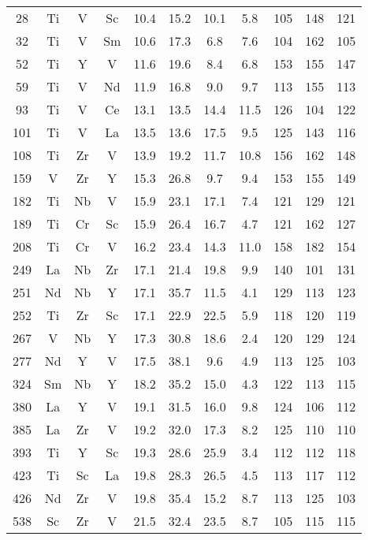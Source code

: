 \begin{center}
\begin{xtabular}{c|ccc|cccc|ccc}
 28 &  Ti &  V &  Sc & 10.4 & 15.2 & 10.1 & 5.8 & 105 & 148 & 121 \\
 32 &  Ti &  V &  Sm & 10.6 & 17.3 & 6.8 & 7.6 & 104 & 162 & 105 \\
 52 &  Ti &  Y &  V & 11.6 & 19.6 & 8.4 & 6.8 & 153 & 155 & 147 \\
 59 &  Ti &  V &  Nd & 11.9 & 16.8 & 9.0 & 9.7 & 113 & 155 & 113 \\
 93 &  Ti &  V &  Ce & 13.1 & 13.5 & 14.4 & 11.5 & 126 & 104 & 122 \\
 101 &  Ti &  V &  La & 13.5 & 13.6 & 17.5 & 9.5 & 125 & 143 & 116 \\
 108 &  Ti &  Zr &  V & 13.9 & 19.2 & 11.7 & 10.8 & 156 & 162 & 148 \\
 159 &  V &  Zr &  Y & 15.3 & 26.8 & 9.7 & 9.4 & 153 & 155 & 149 \\
 182 &  Ti &  Nb &  V & 15.9 & 23.1 & 17.1 & 7.4 & 121 & 129 & 121 \\
 189 &  Ti &  Cr &  Sc & 15.9 & 26.4 & 16.7 & 4.7 & 121 & 162 & 127 \\
 208 &  Ti &  Cr &  V & 16.2 & 23.4 & 14.3 & 11.0 & 158 & 182 & 154 \\
 249 &  La &  Nb &  Zr & 17.1 & 21.4 & 19.8 & 9.9 & 140 & 101 & 131 \\
 251 &  Nd &  Nb &  Y & 17.1 & 35.7 & 11.5 & 4.1 & 129 & 113 & 123 \\
 252 &  Ti &  Zr &  Sc & 17.1 & 22.9 & 22.5 & 5.9 & 118 & 120 & 119 \\
 267 &  V &  Nb &  Y & 17.3 & 30.8 & 18.6 & 2.4 & 120 & 129 & 124 \\
 277 &  Nd &  Y &  V & 17.5 & 38.1 & 9.6 & 4.9 & 113 & 125 & 103 \\
 324 &  Sm &  Nb &  Y & 18.2 & 35.2 & 15.0 & 4.3 & 122 & 113 & 115 \\
 380 &  La &  Y &  V & 19.1 & 31.5 & 16.0 & 9.8 & 124 & 106 & 112 \\
 385 &  La &  Zr &  V & 19.2 & 32.0 & 17.3 & 8.2 & 125 & 110 & 110 \\
 393 &  Ti &  Y &  Sc & 19.3 & 28.6 & 25.9 & 3.4 & 112 & 112 & 118 \\
 423 &  Ti &  Sc &  La & 19.8 & 28.3 & 26.5 & 4.5 & 113 & 117 & 112 \\
 426 &  Nd &  Zr &  V & 19.8 & 35.4 & 15.2 & 8.7 & 113 & 125 & 103 \\
 538 &  Sc &  Zr &  V & 21.5 & 32.4 & 23.5 & 8.7 & 105 & 115 & 115 \\

\end{xtabular}
\end{center}
